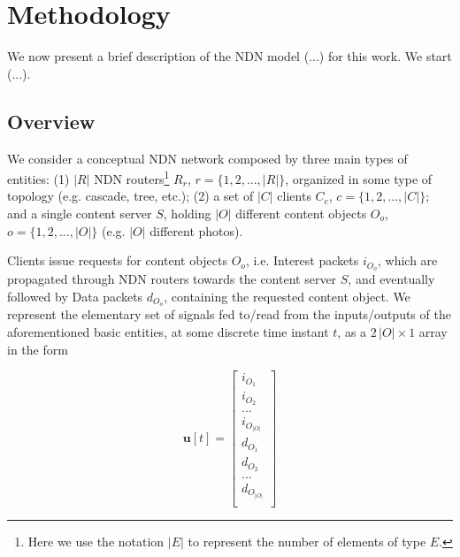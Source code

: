 \section{Methodology}
\label{sec:methodology}

We now present a brief description of the NDN model (...) for this work. We 
start (...).

\subsection{Overview}
\label{subsec:meth-overview}

We consider a conceptual NDN network composed by three main types of 
entities: (1) 
$|R|$ NDN routers\footnote{Here we use the notation $|E|$ to 
represent the number of elements of type $E$.} $R_r$, $r = \{1,2,...,|R|\}$, 
organized in some type of topology (e.g. cascade, tree, etc.); (2) a set of 
$|C|$ clients $C_c$, $c = \{1,2,...,|C|\}$; and a single 
content server $S$, holding $|O|$ different content objects $O_o$, 
$o = \{1,2,...,|O|\}$ (e.g. $|O|$ different photos).\shortvertbreak

Clients issue requests for content objects $O_o$, i.e. Interest packets $i_{O_o}$, which 
are propagated through NDN routers towards the content server $S$, and 
eventually followed by Data packets 
$d_{O_o}$, containing the requested content object. We represent the 
elementary set of signals fed to\slash read from the inputs\slash outputs of the 
aforementioned basic 
entities, at some discrete time instant $t$, as a $2\,|O| \times 1 $ array in the form

\begin{equation}
    \textbf{u}[t] = \begin{bmatrix}  i_{O_1}         \\ 
                            i_{O_2}         \\ 
                             ...            \\ 
                            i_{O_{|O|}}     \\ 
                            d_{O_1}         \\ 
                            d_{O_2}         \\ 
                             ...            \\ 
                            d_{O_{|O|}}     \\ \end{bmatrix}
    \label{eq:signal}
\end{equation}\shortvertbreak

